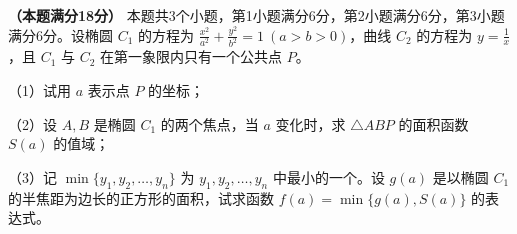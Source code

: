 \begin{question}
\textbf{（本题满分18分）} 本题共3个小题，第1小题满分6分，第2小题满分6分，第3小题满分6分。设椭圆 $C_1$ 的方程为 $\frac{x^2}{a^2}+\frac{y^2}{b^2}=1\ (a>b>0)$，曲线 $C_2$ 的方程为 $y=\frac1x$，且 $C_1$ 与 $C_2$ 在第一象限内只有一个公共点 $P$。

（1）试用 $a$ 表示点 $P$ 的坐标；

（2）设 $A,B$ 是椭圆 $C_1$ 的两个焦点，当 $a$ 变化时，求 $\triangle ABP$ 的面积函数 $S(a)$ 的值域；

（3）记 $\min\{y_1,y_2,\ldots,y_n\}$ 为 $y_1,y_2,\ldots,y_n$ 中最小的一个。设 $g(a)$ 是以椭圆 $C_1$ 的半焦距为边长的正方形的面积，试求函数 $f(a)=\min\{g(a),S(a)\}$ 的表达式。

\end{question}